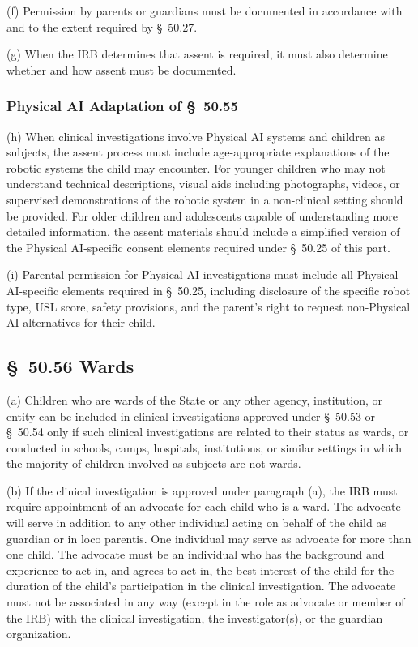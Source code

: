 (f) Permission by parents or guardians must be documented in accordance with and to the extent required by \S~50.27.

(g) When the IRB determines that assent is required, it must also determine whether and how assent must be documented.

\subsubsection{Physical AI Adaptation of \S~50.55}

(h) When clinical investigations involve Physical AI systems and children as subjects, the assent process must include age-appropriate explanations of the robotic systems the child may encounter. For younger children who may not understand technical descriptions, visual aids including photographs, videos, or supervised demonstrations of the robotic system in a non-clinical setting should be provided. For older children and adolescents capable of understanding more detailed information, the assent materials should include a simplified version of the Physical AI-specific consent elements required under \S~50.25 of this part.

(i) Parental permission for Physical AI investigations must include all Physical AI-specific elements required in \S~50.25, including disclosure of the specific robot type, USL score, safety provisions, and the parent's right to request non-Physical AI alternatives for their child.

\subsection{\S~50.56 Wards}

(a) Children who are wards of the State or any other agency, institution, or entity can be included in clinical investigations approved under \S~50.53 or \S~50.54 only if such clinical investigations are related to their status as wards, or conducted in schools, camps, hospitals, institutions, or similar settings in which the majority of children involved as subjects are not wards.

(b) If the clinical investigation is approved under paragraph (a), the IRB must require appointment of an advocate for each child who is a ward. The advocate will serve in addition to any other individual acting on behalf of the child as guardian or in loco parentis. One individual may serve as advocate for more than one child. The advocate must be an individual who has the background and experience to act in, and agrees to act in, the best interest of the child for the duration of the child's participation in the clinical investigation. The advocate must not be associated in any way (except in the role as advocate or member of the IRB) with the clinical investigation, the investigator(s), or the guardian organization.

